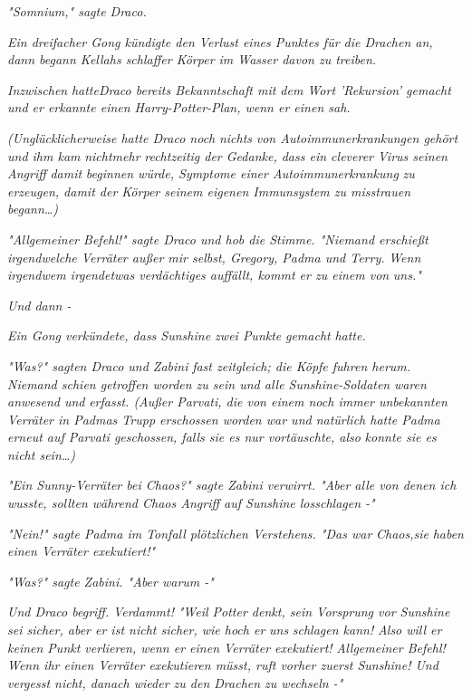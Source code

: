 {\emph{"\emph{Somnium,}" sagte Draco.}

\emph{Ein dreifacher Gong kündigte den Verlust eines Punktes für die Drachen an, dann begann Kellahs schlaffer Körper im Wasser davon zu treiben.}

\emph{Inzwischen} \emph{\emph{hatte}Draco bereits Bekanntschaft mit dem Wort 'Rekursion' gemacht und er erkannte einen Harry-Potter-Plan, wenn er einen sah.}

\emph{(Unglücklicherweise hatte Draco noch} \emph{\emph{nichts}} \emph{von Autoimmunerkrankungen gehört und ihm kam} \emph{\emph{nicht}mehr} \emph{rechtzeitig der Gedanke, dass ein cleverer Virus seinen Angriff} \emph{damit} \emph{beginnen würde, Symptome einer Autoimmunerkrankung} \emph{zu} \emph{erzeugen, damit der Körper seinem eigenen Immunsystem zu misstrauen begann…)}

\emph{"\emph{Allgemeiner Befehl!}" sagte Draco und hob die Stimme. "Niemand erschießt irgendwelche Verräter außer mir selbst, Gregory, Padma und Terry.} \emph{Wenn irgendwem irgendetwas verdächtiges auffällt, kommt er zu einem von} \emph{\emph{uns.}"}

\emph{Und dann -}

\emph{Ein Gong verkündete, dass Sunshine zwei Punkte} \emph{gemacht} \emph{hatte.}

\emph{"\emph{Was?}" sagten Draco und Zabini} \emph{fast zeitgleich; die Köpfe fuhren herum. Niemand schien getroffen worden zu sein und alle Sunshine-Soldaten} \emph{waren anwesend und} \emph{erfasst. (Außer Parvati, die von einem noch immer unbekannten Verräter in Padmas Trupp erschossen worden war und natürlich hatte Padma erneut auf Parvati geschossen, falls sie es nur vortäuschte, also} \emph{konnte sie es nicht sein…)}

\emph{"Ein Sunny-Verräter bei Chaos?" sagte Zabini verwirrt. "Aber alle von denen ich wusste, sollten während Chaos Angriff auf Sunshine losschlagen -"}

\emph{"Nein!" sagte Padma im Tonfall plötzlichen Verstehens. "Das war} \emph{\emph{Chaos,}sie} \emph{haben} \emph{einen Verräter exekutiert!"}

\emph{"\emph{Was?}" sagte Zabini. "Aber warum -"}

\emph{Und Draco begriff.} \emph{\emph{Verdammt!}} \emph{"Weil Potter denkt, sein Vorsprung vor Sunshine sei sicher, aber er ist nicht sicher, wie hoch er} \emph{\emph{uns}} \emph{schlagen kann!} \emph{Also will er keinen Punkt verlieren, wenn er einen Verräter exekutiert!} \emph{\emph{Allgemeiner Befehl!}} \emph{Wenn ihr einen Verräter exekutieren müsst, ruft vorher zuerst Sunshine! Und vergesst nicht, danach wieder zu den Drachen zu wechseln -"}

}
